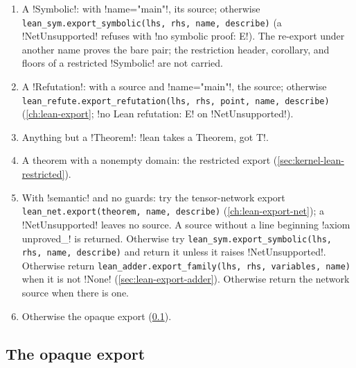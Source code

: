 \begin{algorithm}\label{alg:kernel-lean}
\begin{enumerate}
\item A \py!Symbolic!: with \code!name="main"!, its source; otherwise \texttt{lean\_\allowbreak{}sym.\allowbreak{}export\_\allowbreak{}symbolic(\allowbreak{}lhs,\allowbreak{} rhs,\allowbreak{} name,\allowbreak{} describe)} (a \py!NetUnsupported! refuses with \code!no symbolic proof: E!). The re-export under another name proves the bare pair; the restriction header, corollary, and floors of a restricted \py!Symbolic! are not carried.
\item A \py!Refutation!: with a source and \code!name="main"!, the source; otherwise \texttt{lean\_\allowbreak{}refute.\allowbreak{}export\_\allowbreak{}refutation(\allowbreak{}lhs,\allowbreak{} rhs,\allowbreak{} point,\allowbreak{} name,\allowbreak{} describe)} (\cref{ch:lean-export}; \code!no Lean refutation: E! on \py!NetUnsupported!).
\item Anything but a \py!Theorem!: \code!lean takes a Theorem, got T!.
\item A theorem with a nonempty domain: the restricted export (\cref{sec:kernel-lean-restricted}).
\item With \code!semantic! and no guards: try the tensor-network export \texttt{lean\_\allowbreak{}net.\allowbreak{}export(\allowbreak{}theorem,\allowbreak{} name,\allowbreak{} describe)} (\cref{ch:lean-export-net}); a \py!NetUnsupported! leaves no source. A source without a line beginning \code!axiom unproved_! is returned. Otherwise try \texttt{lean\_\allowbreak{}sym.\allowbreak{}export\_\allowbreak{}symbolic(\allowbreak{}lhs,\allowbreak{} rhs,\allowbreak{} name,\allowbreak{} describe)} and return it unless it raises \py!NetUnsupported!. Otherwise return \texttt{lean\_\allowbreak{}adder.\allowbreak{}export\_\allowbreak{}family(\allowbreak{}lhs,\allowbreak{} rhs,\allowbreak{} variables,\allowbreak{} name)} when it is not \py!None! (\cref{sec:lean-export-adder}). Otherwise return the network source when there is one.
\item Otherwise the opaque export (\cref{sec:kernel-opaque}).
\end{enumerate}
\end{algorithm}

\subsection{The opaque export}\label{sec:kernel-opaque}

